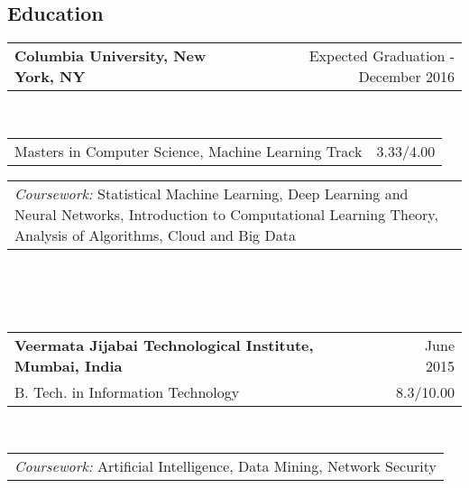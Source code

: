 \documentclass[margin,line]{res}
\begin{document}
\address {sm4083@columbia.edu $\mid$ 929-373-8678 $\mid$ 567 West 125th St. New York NY 10027}
\begin{resume}

\section{\sc\bf Education}
\begin{tabular}{p{3.41in}  r}
\bf Columbia University, New York, NY & Expected Graduation - December 2016
\end{tabular}
\\
\begin{tabular}{p{5.2in} r}
Masters in Computer Science, Machine Learning Track & 3.33/4.00
\end{tabular}
\begin{tabular}{p{5.92in}}
\textit{Coursework:} Statistical Machine Learning, Deep Learning and Neural Networks, Introduction to Computational Learning Theory, Analysis of Algorithms, Cloud and Big Data
\end{tabular}
\\\\\\
\begin{tabular}{p{5.136in} r}
\bf Veermata Jijabai Technological Institute, Mumbai, India & June 2015\\
B. Tech. in Information Technology & 8.3/10.00
\end{tabular}
\\
\begin{tabular}{p{5.92in}}
\textit{Coursework:} Artificial Intelligence, Data Mining, Network Security
\end{tabular}


\end{resume}
\end{document}
